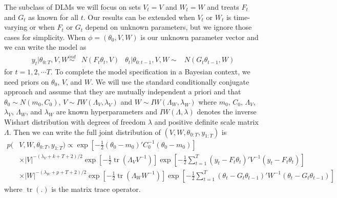 \documentclass{article}
\DeclareMathOperator{\tr}{tr}
\begin{document}
The subclass of DLMs we will focus on sets $V_t=V$ and $W_t=W$ and treats $F_{t}$ and $G_{t}$ as known for all $t$. Our results can be extended when $V_t$ or $W_t$ is time-varying or when $F_t$ or $G_t$ depend on unknown parameters, but we ignore those cases for simplicity. When $\phi=(\theta_0,V,W)$ is our unknown parameter vector and we can write the model as
\begin{align}
  y_t|\theta_{0:T},V,W \stackrel{ind}{\sim} & N(F_t\theta_t,V) &
  \theta_t|\theta_{0:t-1},V,W  \sim & N(G_t\theta_{t-1},W) \label{dlmbotheqs}
\end{align}
for $t=1,2,\cdots T$. To complete the model specification in a Bayesian context, we need priors on $\theta_0$, $V$, and $W$. We will use the standard conditionally conjugate approach and assume that they are mutually independent a priori and that $\theta_0 \sim N(m_0, C_0)$, $V \sim IW(\Lambda_V, \lambda_V)$ and $W \sim IW(\Lambda_W, \lambda_W)$ where $m_0$, $C_0$, $\Lambda_V$, $\lambda_V$, $\Lambda_W$, and $\lambda_W$ are known hyperparameters and $IW(\Lambda, \lambda)$ denotes the inverse Wishart distribution with degrees of freedom $\lambda$ and positive definite scale matrix $\Lambda$. Then we can write the full joint distribution of $(V,W,\theta_{0:T},y_{1:T})$ is
\begin{align}
  p(&V,W,\theta_{0:T},y_{1:T}) \propto \exp\left[-\frac{1}{2}(\theta_0-m_0)'C_0^{-1}(\theta_0-m_0)\right] \nonumber\\
  &\times   |V|^{-(\lambda_V + k + T + 2)/2}\exp\left[-\frac{1}{2}\tr\left(\Lambda_VV^{-1}\right)\right] \exp\left[-\frac{1}{2}\sum_{t=1}^T(y_t - F_t\theta_t)'V^{-1}(y_t - F_t\theta_t)\right] \nonumber\\
   & \times |W|^{-(\lambda_W + p + T + 2)/2}\exp\left[-\frac{1}{2}\tr\left(\Lambda_WW^{-1}\right)\right]\exp\left[-\frac{1}{2}\sum_{t=1}^T(\theta_t-G_t\theta_{t-1})'W^{-1}(\theta_t-G_t\theta_{t-1})\right]\label{dlmjoint}
 \end{align}
where $\tr(.)$ is the matrix trace operator.
\end{document}
